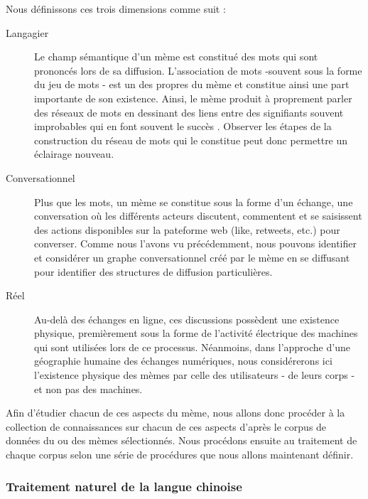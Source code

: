     Nous définissons ces trois dimensions comme suit :

    \begin{description}
        \item[Langagier]
        Le champ sémantique d{\textquoteright}un mème est constitué des mots qui sont prononcés lors de sa diffusion. L{\textquoteright}association de mots -souvent sous la forme du jeu de mots - est un des propres du mème et constitue ainsi une part importante de son existence. Ainsi, le mème produit à proprement parler des réseaux de mots en dessinant des liens entre des signifiants souvent improbables qui en font souvent le succès \citep{Bauckhage2011}. Observer les étapes de la construction du réseau de mots qui le constitue peut donc permettre un éclairage nouveau.

        \item[Conversationnel] 
        Plus que les mots, un mème se constitue sous la forme d{\textquoteright}un échange, une conversation o\`u les différents acteurs discutent, commentent et se saisissent des actions disponibles sur la pateforme web (like, retweets, etc.) pour converser. Comme nous l{\textquoteright}avons vu précédemment, nous pouvons identifier et considérer un graphe conversationnel créé par le mème en se diffusant pour identifier des structures de diffusion particulières. 

        \item[Réel] 
        Au-delà des échanges en ligne, ces discussions possèdent une existence physique, premièrement sous la forme de l{\textquoteright}activité électrique des machines qui sont utilisées lors de ce processus. Néanmoins, dans l{\textquoteright}approche d{\textquoteright}une géographie humaine des échanges numériques, nous considérerons ici l{\textquoteright}existence physique des mèmes par celle des utilisateurs - de leurs corps - et non pas des machines. 
    \end{description}

    Afin d{\textquoteright}étudier chacun de ces aspects du mème, nous allons donc procéder à la collection de connaissances sur chacun de ces aspects d'après le corpus de données du ou des mèmes sélectionnés. Nous procédons ensuite au traitement de chaque corpus selon une série de procédures que nous allons maintenant définir. 

\subsubsection[Traitement naturel de la langue chinoise]{Traitement naturel de la langue chinoise}

